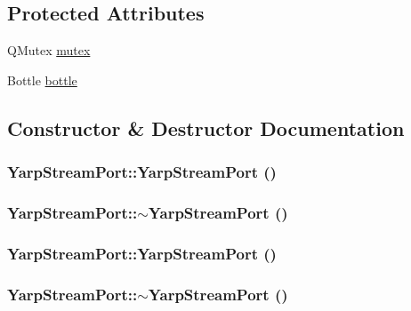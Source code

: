 \subsection*{Protected Attributes}
\begin{DoxyCompactItemize}
\item 
QMutex \hyperlink{class_yarp_stream_port_afe137a99b998f77163794f17f87c1af6}{mutex}
\item 
Bottle \hyperlink{class_yarp_stream_port_a02845704378d6350813b496589403cd7}{bottle}
\end{DoxyCompactItemize}


\subsection{Constructor \& Destructor Documentation}
\hypertarget{class_yarp_stream_port_aa9bc88cfd89f533676960ba59629af84}{
\subsubsection[{YarpStreamPort}]{\setlength{\rightskip}{0pt plus 5cm}YarpStreamPort::YarpStreamPort ()}}
\label{class_yarp_stream_port_aa9bc88cfd89f533676960ba59629af84}
\hypertarget{class_yarp_stream_port_ac0923822f1b4ab48ef2fd7600184be98}{
\subsubsection[{$\sim$YarpStreamPort}]{\setlength{\rightskip}{0pt plus 5cm}YarpStreamPort::$\sim$YarpStreamPort ()}}
\label{class_yarp_stream_port_ac0923822f1b4ab48ef2fd7600184be98}
\hypertarget{class_yarp_stream_port_aa9bc88cfd89f533676960ba59629af84}{
\subsubsection[{YarpStreamPort}]{\setlength{\rightskip}{0pt plus 5cm}YarpStreamPort::YarpStreamPort ()}}
\label{class_yarp_stream_port_aa9bc88cfd89f533676960ba59629af84}
\hypertarget{class_yarp_stream_port_ac0923822f1b4ab48ef2fd7600184be98}{
\subsubsection[{$\sim$YarpStreamPort}]{\setlength{\rightskip}{0pt plus 5cm}YarpStreamPort::$\sim$YarpStreamPort ()}}
\label{class_yarp_stream_port_ac0923822f1b4ab48ef2fd7600184be98}


